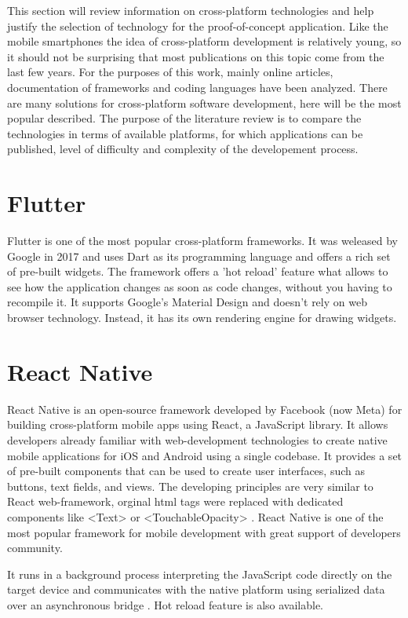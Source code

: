 This section will review information on cross-platform technologies and help justify the selection of technology for the proof-of-concept application. Like the mobile smartphones the idea of cross-platform development is relatively young, so it should not be surprising that most publications on this topic come from the last few years. For the purposes of this work, mainly online articles, documentation of frameworks and coding languages have been analyzed. There are many solutions for cross-platform software development, here will be the most popular described. The purpose of the literature review is to compare the technologies in terms of available platforms, for which applications can be published, level of difficulty and complexity of the developement process.


\section{{Flutter}}%
\label{sec:flutter}

Flutter is one of the most popular cross-platform frameworks. It was weleased by Google in 2017 and uses Dart as its programming language and offers a rich set of pre-built widgets.
The framework offers a 'hot reload' feature what allows to see how the application changes as soon as code changes, without you having to recompile it. It supports Google's Material Design and doesn't rely on web browser technology. Instead, it has its own rendering engine for drawing widgets.

\section{{React Native}}%
\label{sec:reactnative}

React Native is an open-source framework developed by Facebook (now Meta) for building cross-platform mobile apps using React, a JavaScript library. It allows developers already familiar with  web-development technologies to create native mobile applications for iOS and Android using a single codebase. It provides a set of pre-built components that can be used to create user interfaces, such as buttons, text fields, and views. The developing principles are very similar to React web-framework, orginal html tags were replaced with dedicated components like <Text> or <TouchableOpacity> \autocite{ReactNative}. React Native is one of the most popular framework for mobile development with great support of developers community.

It runs in a background process interpreting the JavaScript code directly on the target device and communicates with the native platform using serialized data over an asynchronous bridge \autocite{ReactNativeMedium}. Hot reload feature is also available.

